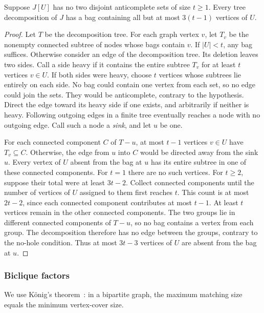 \begin{lemma}
\label{lem:tw-clique-completion}
Suppose $J[U]$ has no two disjoint anticomplete sets of size
$t\ge1$. Every tree decomposition of $J$ has a bag containing
all but at most $3(t-1)$ vertices of $U$.
\end{lemma}

\begin{proof}
Let $T$ be the decomposition tree. For each graph vertex $v$, let
$T_v$ be the nonempty connected subtree of nodes whose bags contain
$v$.
If $|U|<t$, any bag suffices. Otherwise consider an edge of the
decomposition tree. Its deletion leaves two sides. Call a side
heavy if it contains the entire subtree $T_v$ for at least $t$
vertices $v\in U$. If both sides were heavy, choose $t$ vertices whose subtrees lie
entirely on each side. No bag could contain one vertex from each
set, so no edge could join the sets. They would be anticomplete,
contrary to the hypothesis. Direct the edge toward its
heavy side if one exists, and arbitrarily if neither is heavy.
Following outgoing edges in a finite tree eventually reaches a
node with no outgoing edge. Call such a node a \emph{sink}, and let
$u$ be one.

For each connected component $C$ of $T-u$, at most $t-1$ vertices $v\in U$
have $T_v\subseteq C$. Otherwise, the edge from $u$ into $C$ would be
directed away from the sink $u$. Every vertex of $U$ absent from the
bag at $u$ has its entire subtree in one of these connected components.
For $t=1$ there are no such vertices. For $t\ge2$, suppose their
total were at least $3t-2$. Collect connected components until the number of
vertices of $U$ assigned to them first reaches $t$. This count is at most
$2t-2$, since each connected component contributes at most $t-1$. At least
$t$ vertices remain in the other connected components. The two groups lie in
different connected components of $T-u$, so no bag contains a vertex from each
group. The decomposition therefore has no edge between the groups,
contrary to the no-hole condition. Thus at most $3t-3$ vertices of $U$
are absent from the bag at $u$.
\end{proof}

\subsubsection{Biclique factors}

We use K\"onig's theorem~\cite[Theorem~2.1.1]{Diestel2017}: in a
bipartite graph, the maximum matching size equals the minimum
vertex-cover size.

